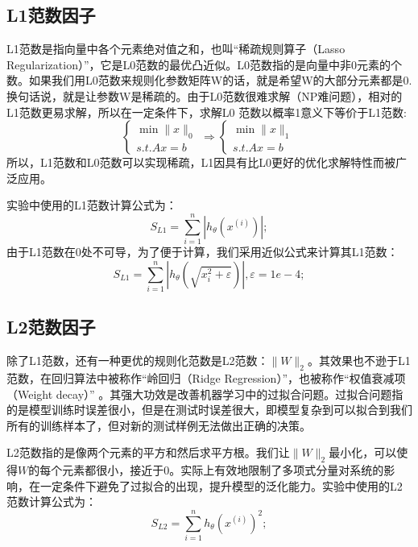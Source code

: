 \documentclass[oneside]{ZJUthesis}
\begin{document}
\subsection{L1范数因子}
L1范数是指向量中各个元素绝对值之和，也叫``稀疏规则算子（Lasso Regularization）''，它是L0范数的最优凸近似\cite{DBLP:conf/cvpr/YangYGH09}。L0范数指的是向量中非0元素的个数。如果我们用L0范数来规则化参数矩阵W的话，就是希望W的大部分元素都是0.换句话说，就是让参数W是稀疏的。由于L0范数很难求解（NP难问题），相对的L1范数更易求解，所以在一定条件下，求解L0 范数以概率1意义下等价于L1范数:
\begin{equation}
\left\{ \begin{array}{l}
\min \|x\|_0 \\
s.t.Ax = b
\end{array} \right. \Rightarrow \left\{ \begin{array}{l}
\min \|x\|_1 \\
s.t.Ax = b
\end{array} \right.
\end{equation}
所以，L1范数和L0范数可以实现稀疏，L1因具有比L0更好的优化求解特性而被广泛应用。

实验中使用的L1范数计算公式为：
\begin{equation}
S_{L1}=\sum\limits_{i=1}^{n}{|h_{\theta}(x^{(i)})|};
\end{equation}
由于L1范数在0处不可导\cite{DBLP:conf/nips/LeeBRN06}，为了便于计算，我们采用近似公式来计算其L1范数\cite{DBLP:journals/corr/abs-1005-4717}：
\begin{equation}
S_{L1}=\sum\limits_{i=1}^{n}{|h_{\theta}(\sqrt{x_i^2+\varepsilon})|},\varepsilon =1e-4;
\end{equation}

\subsection{L2范数因子}
除了L1范数，还有一种更优的规则化范数是L2范数：$\|W\|_2$。其效果也不逊于L1范数，在回归算法中被称作``岭回归（Ridge Regression）''，也被称作``权值衰减项（Weight decay）'' \cite{yang2011robust}。其强大功效是改善机器学习中的过拟合问题。过拟合问题指的是模型训练时误差很小，但是在测试时误差很大，即模型复杂到可以拟合到我们所有的训练样本了，但对新的测试样例无法做出正确的决策。

L2范数指的是像两个元素的平方和然后求平方根。我们让$\|W\|_2$最小化，可以使得$W$的每个元素都很小，接近于0。实际上有效地限制了多项式分量对系统的影响，在一定条件下避免了过拟合的出现，提升模型的泛化能力。实验中使用的L2范数计算公式为：
\begin{equation}
S_{L2}=\sum\limits_{i=1}^{n}{h_{\theta}(x^{(i)})^2};
\end{equation}
\end{document}
